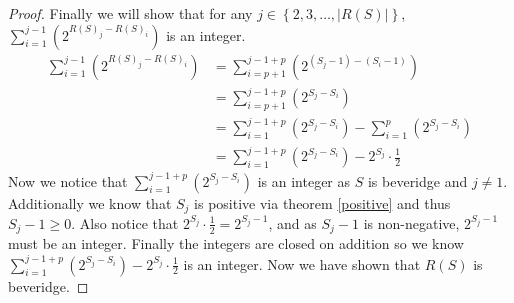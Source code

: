 \documentclass{macjourn}
\def\useLim{}
\newcommand{\sumfrom}[3]{\sum\useLim_{#1}^{#2} \left( {#3} \right)}
\newcommand{\set}[1]{\left\{ {#1} \right\}}
\newcommand{\cardinality}[1]{\left| #1 \right|}
\theoremstyle{definition}
\begin{document}
\begin{proof}
		Finally we will show that for any $j \in \set{2, 3, \ldots, \cardinality{R(S)}}$, $\sumfrom{i=1}{j-1}{2^{R(S)_j-R(S)_i}}$ is an integer.
		\begin{align*}
			\sumfrom{i=1}{j-1}{2^{R(S)_j-R(S)_i}}
			&= \sumfrom{i=p+1}{j-1 + p}{2^{(S_j - 1) - (S_i - 1)}} \\
			&= \sumfrom{i=p + 1}{j-1 + p}{2^{S_j - S_i}}\\
			&= \sumfrom{i=1}{j-1+p}{2^{S_j-S_i}} - \sumfrom{i=1}{p}{2^{S_j-S_i}}\\
			&= \sumfrom{i=1}{j-1+p}{2^{S_j - S_i}} - 2^{S_j}\cdot\frac12
		\end{align*}
		Now we notice that $\sumfrom{i=1}{j-1+p}{2^{S_j-S_i}}$ is an integer as $S$ is beveridge and $j\not= 1$. Additionally we know that $S_j$ is positive via theorem \ref{positive} and thus $S_j-1 \ge 0$. Also notice that $2^{S_j}\cdot\frac12 = 2^{S_j - 1}$, and as $S_j-1$ is non-negative, $2^{S_j-1}$ must be an integer. Finally the integers are closed on addition so we know $\sumfrom{i=1}{j-1+p}{2^{S_j - S_i}} - 2^{S_j}\cdot\frac12$ is an integer. Now we have shown that $R(S)$ is beveridge.
	\end{proof}
	
\end{document}
